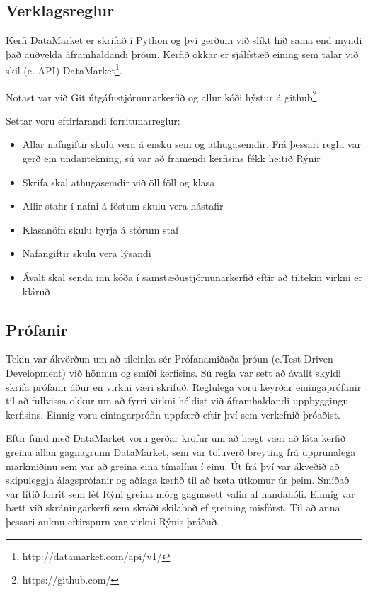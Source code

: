 \documentclass{article}
\begin{document}
\subsection{Verklagsreglur}
Kerfi DataMarket er skrifað í Python og því gerðum við slíkt hið sama end myndi það auðvelda áframhaldandi þróun. Kerfið okkar er sjálfstæð eining sem talar við skil (e. API) DataMarket\footnote[1]{http://datamarket.com/api/v1/}. 
	
Notast var við Git útgáfustjórnunarkerfið og allur kóði hýstur á github\footnote[2]{https://github.com/}. 

Settar voru eftirfarandi forritunarreglur:

\begin{itemize}
  \item Allar nafngiftir skulu vera á ensku sem og athugasemdir. Frá þessari reglu var gerð ein undantekning, sú var að framendi kerfisins fékk heitið Rýnir
  \item Skrifa skal athugasemdir við öll föll og klasa
  \item Allir stafir í nafni á föstum skulu vera hástafir
  \item Klasanöfn skulu byrja á stórum staf
  \item Nafangiftir skulu vera lýsandi
  \item Ávalt skal senda inn kóða í samstæðustjórnunarkerfið eftir að tiltekin virkni er kláruð
\end{itemize}

\subsection{Prófanir}
Tekin var ákvörðun um að tileinka sér Prófanamiðaða þróun (e.Test-Driven Development) við hönnun og smíði kerfisins.
Sú regla var sett að ávallt skyldi skrifa prófanir áður en virkni væri skrifuð.
Reglulega voru keyrðar einingaprófanir til að fullvissa okkur um að fyrri virkni héldist við áframhaldandi uppbyggingu kerfisins.
Einnig voru einingarprófin uppfærð eftir því sem verkefnið þróaðist.

Eftir fund með DataMarket voru gerðar kröfur um að hægt væri að láta kerfið greina allan gagnagrunn DataMarket, sem var töluverð breyting 
frá upprunalega markmiðinu sem var að greina eina tímalínu í einu.
Út frá því var ákveðið að skipuleggja álagsprófanir og aðlaga kerfið til að bæta útkomur úr þeim.
Smíðað var lítið forrit sem lét Rýni greina mörg gagnasett valin af handahófi. Einnig var bætt við skráningarkerfi 
sem skráði skilaboð ef greining misfórst. Til að anna þessari auknu eftirspurn var virkni Rýnis þráðuð.
\end{document}
